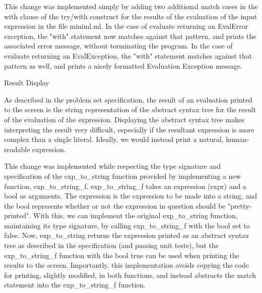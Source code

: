 \documentclass{article}
\begin{document}
This change was implemented simply by adding two additional match cases in the with clause of the try/with construct for the results of the evaluation of the input expression in the file miniml.ml. In the case of evaluate returning an EvalError exception, the "with" statement now matches against that pattern, and prints the associated error message, without terminating the program. In the case of evaluate returning an EvalException, the "with" statement matches against that pattern as well, and prints a nicely formatted Evaluation Exception message.

{\large Result Display \par}
As described in the problem set specification, the result of an evaluation printed to the screen is the string representation of the abstract syntax tree for the result of the evaluation of the expression. Displaying the abstract syntax tree makes interpreting the result very difficult, especially if the resultant expression is more complex than a single literal. Ideally, we would instead print a natural, human-readable expression. 

This change was implemented while respecting the type signature and specification of the exp\_to\_string function provided by implementing a new function, exp\_to\_string\_f. exp\_to\_string\_f takes an expression (expr) and a bool as arguments. The expression is the expression to be made into a string, and the bool represents whether or not the expression in question should be "pretty-printed". With this, we can implement the original exp\_to\_string function, maintaining its type signature, by calling exp\_to\_string\_f with the bool set to false. Now, exp\_to\_string returns the expression printed as an abstract syntax tree as described in the specification (and passing unit tests), but the exp\_to\_string\_f function with the bool true can be used when printing the results to the screen. Importantly, this implementation avoids copying the code for printing, slightly modified, in both functions, and instead abstracts the match statement into the exp\_to\_string\_f function. 
\end{document}
